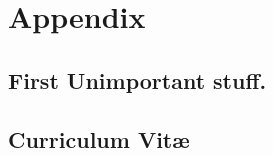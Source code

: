 \part{Appendix}
\label{part:appendix}

\chapter{First Unimportant stuff.}
\label{cha:first-unimp-stuff}

\blindtext

\chapter{Curriculum Vit\ae}

